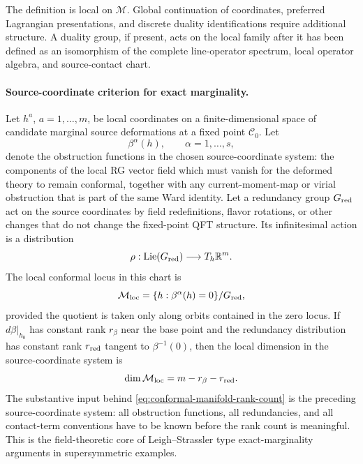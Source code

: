 The definition is local on \(\mathcal M\).  Global continuation of
coordinates, preferred Lagrangian presentations, and discrete duality
identifications require additional structure.  A duality group, if present, acts on
the local family after it has been defined as an isomorphism of the complete
line-operator spectrum, local operator algebra, and source-contact chart.

\paragraph{Source-coordinate criterion for exact marginality.}
Let \(h^a\), \(a=1,\ldots,m\), be local coordinates on a finite-dimensional
space of candidate marginal source deformations at a fixed point
\(\mathcal C_0\).  Let
\[
  \beta^\alpha(h),\qquad \alpha=1,\ldots,s,
\]
denote the obstruction functions in the chosen source-coordinate system: the components of
the local RG vector field which must vanish for the deformed theory to remain
conformal, together with any current-moment-map or virial obstruction that is
part of the same Ward identity.  Let a redundancy group \(G_{\rm red}\) act on
the source coordinates by field redefinitions, flavor rotations, or other
changes that do not change the fixed-point QFT structure.  Its infinitesimal
action is a distribution
\[
  \rho:\operatorname{Lie}(G_{\rm red})\longrightarrow T_h\mathbb R^m .
\]
The local conformal locus in this chart is
\begin{equation}
  \mathcal M_{\rm loc}
  =
  \{h:\beta^\alpha(h)=0\}/G_{\rm red},
  \label{eq:local-conformal-locus-source-chart}
\end{equation}
provided the quotient is taken only along orbits contained in the zero locus.
If \(d\beta|_{h_0}\) has constant rank \(r_\beta\) near the base point and
the redundancy distribution has constant rank \(r_{\rm red}\) tangent to
\(\beta^{-1}(0)\), then the local dimension in the source-coordinate system is
\begin{equation}
  \dim \mathcal M_{\rm loc}=m-r_\beta-r_{\rm red}.
  \label{eq:conformal-manifold-rank-count}
\end{equation}
The substantive input behind \eqref{eq:conformal-manifold-rank-count} is the
preceding source-coordinate system: all obstruction functions, all redundancies, and all
contact-term conventions have to be known before the rank count is meaningful.
This is the field-theoretic core of Leigh--Strassler type exact-marginality
arguments in supersymmetric examples.

